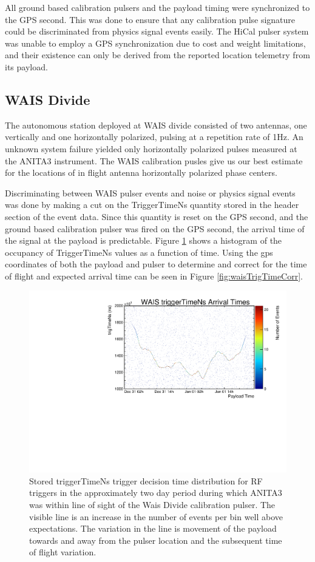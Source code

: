 	All ground based calibration pulsers and the payload timing were synchronized to the GPS second.  This was done to ensure that any calibration pulse signature could be discriminated from physics signal events easily.  The HiCal pulser system was unable to employ a GPS synchronization due to cost and weight limitations, and their existence can only be derived from the reported location telemetry from its payload.
	
	\subsection{WAIS Divide}
		The autonomous station deployed at WAIS divide consisted of two antennas, one vertically and one horizontally polarized, pulsing at a repetition rate of 1Hz.  An unknown system failure yielded only horizontally polarized pulses measured at the ANITA3 instrument.  The WAIS calibration pusles give us our best estimate for the locations of in flight antenna horizontally polarized phase centers.
		
		Discriminating between WAIS pulser events and noise or physics signal events was done by making a cut on the TriggerTimeNs quantity stored in the header section of the event data.  Since this quantity is reset on the GPS second, and the ground based calibration pulser was fired on the GPS second, the arrival time of the signal at the payload is predictable.  Figure \ref{fig:waisTrigTimeNs} shows a histogram of the occupancy of TriggerTimeNs values as a function of time.  Using the gps coordinates of both the payload and pulser to determine and correct for the time of flight and expected arrival time can be seen in Figure \ref{fig:waisTrigTimeCorr}.
		
	\begin{figure}
		\includegraphics[width=\textwidth]{figures/waisTrigTimeNs}
		\caption{Stored triggerTimeNs trigger decision time distribution for RF triggers in the approximately two day period during which ANITA3 was within line of sight of the Wais Divide calibration pulser.  The visible line is an increase in the number of events per bin well above expectations.  The variation in the line is movement of the payload towards and away from the pulser location and the subsequent time of flight variation.}
		\label{fig:waisTrigTimeNs}
	\end{figure}		

